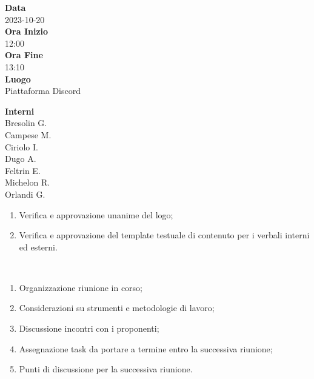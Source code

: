 \documentclass{article}
\begin{document}
\setlength{\columnsep}{2.2em}
\setlength{\columnseprule}{4pt}
\begin{paracol}{2}


\textbf{Data} \\
2023-10-20\\

\textbf{Ora Inizio} \\
12:00\\

\textbf{Ora Fine} \\
13:10\\

\textbf{Luogo} \\
Piattaforma Discord

\vspace{12.5em}


\textbf{Interni} \\
Bresolin G.\\
Campese M.\\
Ciriolo I.\\
Dugo A.\\
Feltrin E.\\
Michelon R.\\
Orlandi G.\\




\switchcolumn



\begin{enumerate}
\item Verifica e approvazione unanime del logo;
\item Verifica e approvazione del template testuale di contenuto per i verbali interni ed esterni.
  
\end{enumerate}

\vspace{23em}

\\

\begin{enumerate}
    \item Organizzazione riunione in corso;
    \item Considerazioni su strumenti e metodologie di lavoro;
    \item Discussione incontri con i proponenti;
     \item Assegnazione task da portare a termine entro la successiva riunione;
    \item Punti di discussione per la successiva riunione.
    

\end{enumerate}
\end{paracol}
\end{document}
